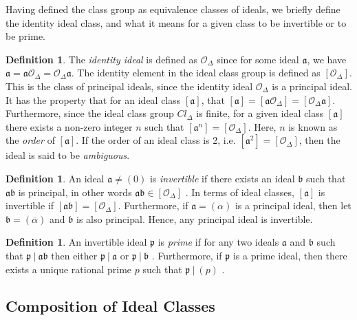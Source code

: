 \documentclass{ucalgthes1}
\theoremstyle{plain}
\theoremstyle{definition}
\newtheorem{defn}[thm]{Definition}
\newcommand{\OO}{\mathcal{O}}
\begin{document}
Having defined the class group as equivalence classes of ideals, we briefly define the identity ideal class, and what it means for a given class to be invertible or to be prime.

\begin{defn}
The \emph{identity ideal} is defined as $\OO_\Delta$ since for some ideal $\mathfrak a$, we have $\mathfrak a = \mathfrak a \OO_\Delta = \OO_\Delta \mathfrak a$.  The identity element in the ideal class group is defined as $[\OO_\Delta]$.  This is the class of principal ideals, since the identity ideal $\OO_\Delta$ is a principal ideal.  It has the property that for an ideal class $[\mathfrak a]$, that $[\mathfrak a] = [\mathfrak a \OO_\Delta] = [\OO_\Delta \mathfrak a]$. Furthermore, since the ideal class group $Cl_\Delta$ is finite, for a given ideal class $[\mathfrak a]$ there exists a non-zero integer $n$ such that $[{\mathfrak a}^n] = [\OO_\Delta]$.  Here, $n$ is known as the \emph{order} of $[\mathfrak a]$.  If the order of an ideal class is 2, i.e. $[\mathfrak a^2] = [\OO_\Delta]$, then the ideal is said to be \emph{ambiguous}.
\end{defn}


\begin{defn}
An ideal $\mathfrak a \neq (0)$ is \emph{invertible} if there exists an ideal $\mathfrak b$ such that $\mathfrak a \mathfrak b$ is principal, in other words $\mathfrak a \mathfrak b \in [\OO_\Delta]$ \cite[Definition 4.29]{Jac09}. In terms of ideal classes, $[\mathfrak a]$ is invertible if $[\mathfrak a \mathfrak b] = [\OO_\Delta]$.  Furthermore, if $\mathfrak a = (\alpha)$ is a principal ideal, then let $\mathfrak b = (\overline{\alpha})$ and $\mathfrak b$ is also principal.  Hence, any principal ideal is invertible.
\end{defn}

\begin{defn}
An invertible ideal $\mathfrak p$ is \emph{prime} if for any two ideals $\mathfrak a$ and $\mathfrak b$ such that $\mathfrak p ~|~ \mathfrak a \mathfrak b$ then either $\mathfrak p ~|~ \mathfrak a$ or $\mathfrak p ~|~ \mathfrak b$ \cite[Definition 4.40]{Jac09}.  Furthermore, if $\mathfrak p$ is a prime ideal, then there exists a unique rational prime $p$ such that $\mathfrak p ~|~ (p)$ \cite[Theorem 4.41]{Jac09}.
\end{defn}



\subsection{Composition of Ideal Classes}\label{subsec:idealCompose}
\end{document}
